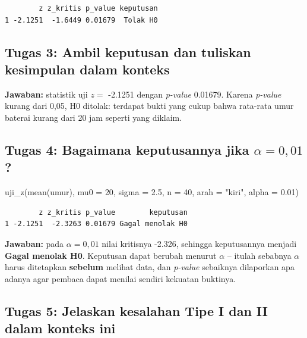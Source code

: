 \documentclass[
  indonesian,
  letterpaper,
]{book}
\newenvironment{Shaded}{\begin{snugshade}}{\end{snugshade}}
\newcommand{\AttributeTok}[1]{\textcolor[rgb]{0.40,0.45,0.13}{#1}}
\newcommand{\DecValTok}[1]{\textcolor[rgb]{0.68,0.00,0.00}{#1}}
\newcommand{\FloatTok}[1]{\textcolor[rgb]{0.68,0.00,0.00}{#1}}
\newcommand{\FunctionTok}[1]{\textcolor[rgb]{0.28,0.35,0.67}{#1}}
\newcommand{\NormalTok}[1]{\textcolor[rgb]{0.00,0.23,0.31}{#1}}
\newcommand{\StringTok}[1]{\textcolor[rgb]{0.13,0.47,0.30}{#1}}
\begin{document}
\begin{verbatim}
        z z_kritis p_value keputusan
1 -2.1251  -1.6449 0.01679  Tolak H0
\end{verbatim}

\subsection{Tugas 3: Ambil keputusan dan tuliskan kesimpulan dalam
konteks}\label{tugas-3-ambil-keputusan-dan-tuliskan-kesimpulan-dalam-konteks}

\textbf{Jawaban:} statistik uji \(z =\) -2.1251 dengan \emph{p-value}
0.01679. Karena \emph{p-value} kurang dari 0,05, H0 ditolak: terdapat
bukti yang cukup bahwa rata-rata umur baterai kurang dari 20 jam seperti
yang diklaim.

\subsection{\texorpdfstring{Tugas 4: Bagaimana keputusannya jika
\(\alpha = 0{,}01\)?}{Tugas 4: Bagaimana keputusannya jika \textbackslash alpha = 0\{,\}01?}}\label{tugas-4-bagaimana-keputusannya-jika-alpha-001}

\begin{Shaded}
\begin{Highlighting}[]
\FunctionTok{uji\_z}\NormalTok{(}\FunctionTok{mean}\NormalTok{(umur), }\AttributeTok{mu0 =} \DecValTok{20}\NormalTok{, }\AttributeTok{sigma =} \FloatTok{2.5}\NormalTok{, }\AttributeTok{n =} \DecValTok{40}\NormalTok{, }\AttributeTok{arah =} \StringTok{"kiri"}\NormalTok{, }\AttributeTok{alpha =} \FloatTok{0.01}\NormalTok{)}
\end{Highlighting}
\end{Shaded}

\begin{verbatim}
        z z_kritis p_value        keputusan
1 -2.1251  -2.3263 0.01679 Gagal menolak H0
\end{verbatim}

\textbf{Jawaban:} pada \(\alpha = 0{,}01\) nilai kritisnya -2.326,
sehingga keputusannya menjadi \textbf{Gagal menolak H0}. Keputusan dapat
berubah menurut \(\alpha\) -- itulah sebabnya \(\alpha\) harus
ditetapkan \textbf{sebelum} melihat data, dan \emph{p-value} sebaiknya
dilaporkan apa adanya agar pembaca dapat menilai sendiri kekuatan
buktinya.

\subsection{Tugas 5: Jelaskan kesalahan Tipe I dan II dalam konteks
ini}\label{tugas-5-jelaskan-kesalahan-tipe-i-dan-ii-dalam-konteks-ini}
\end{document}
